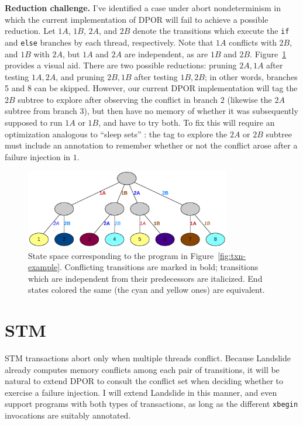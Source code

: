 {\bf Reduction challenge.}
I've identified a case under abort nondeterminism in which the current implementation of DPOR will fail to achieve a possible reduction.
Let $1A$, $1B$, $2A$, and $2B$ denote the transitions which execute the {\tt if} and {\tt else} branches by each thread, respectively.
Note that $1A$ conflicts with $2B$, and $1B$ with $2A$, but $1A$ and $2A$ are independent, as are $1B$ and $2B$.
Figure~\ref{fig:txn-graph} provides a visual aid.
There are two possible reductions: pruning $2A,1A$ after testing $1A,2A$, and pruning $2B,1B$ after testing $1B,2B$;
in other words, branches 5 and 8 can be skipped.
However, %
our current DPOR implementation will tag the $2B$ subtree to explore after observing the conflict in branch 2 (likewise the $2A$ subtree from branch 3),
but then have no memory of whether it was subsequently supposed to run $1A$ or $1B$, and have to try both.
To fix this will require an optimization analogous to ``sleep sets'' \cite{dpor}:
the tag to explore the $2A$ or $2B$ subtree must include an annotation to remember whether or not the conflict arose after a failure injection in $1$.

\begin{figure}[t]
	\begin{center}
		\includegraphics[width=0.8\textwidth]{htm-graph.pdf}
	\end{center}
	\caption{State space corresponding to the program in Figure~\ref{fig:txn-example}.
	Conflicting transitions are marked in bold;
	transitions which are independent from their predecessors are italicized.
	End states colored the same (the cyan and yellow ones) are equivalent.
	}
	\label{fig:txn-graph}
\end{figure}

\section{STM}

STM transactions abort only when multiple threads conflict.
Because Landslide already computes memory conflicts among each pair of transitions, it will be natural to extend DPOR to consult the conflict set when deciding whether to exercise a failure injection.
I will extend Landslide in this manner, and even support programs with both types of transactions, as long as the different {\tt xbegin} invocations are suitably annotated.

